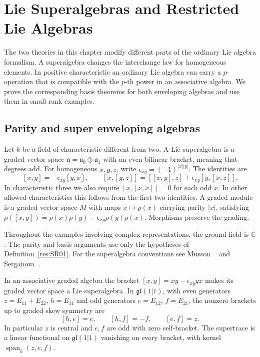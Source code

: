 \chapter{Lie Superalgebras and Restricted Lie Algebras}

The two theories in this chapter modify different parts of the ordinary
Lie algebra formalism. A superalgebra changes the interchange law for
homogeneous elements. In positive characteristic an ordinary Lie
algebra can carry a \(p\)-operation that is compatible with the
\(p\)-th power in an associative algebra. We prove the corresponding
basis theorems for both enveloping algebras and use them in small
rank examples.

\section{Parity and super enveloping algebras}

\begin{definition}
\label{res:SR01}
Let \(k\) be a field of characteristic different from two.
A Lie superalgebra is a graded vector space
\(\mathfrak a=\mathfrak a_{\overline 0}\oplus\mathfrak a_{\overline 1}\)
with an even bilinear bracket, meaning that degrees add. For
homogeneous \(x,y,z\), write
\(\epsilon_{xy}=(-1)^{|x||y|}\).
The identities are
\[
 [x,y]=-\epsilon_{xy}[y,x],
 \qquad [x,[y,z]]=[[x,y],z]+\epsilon_{xy}[y,[x,z]].
\]
In characteristic three we also require
\([x,[x,x]]=0\) for each odd \(x\). In other allowed characteristics
this follows from the first two identities. A graded module is a
graded vector space \(M\) with maps \(x\mapsto \rho(x)\) carrying
parity \(|x|\), satisfying
\(\rho([x,y])=\rho(x)\rho(y)-\epsilon_{xy}\rho(y)\rho(x)\).
Morphisms preserve the grading.
\end{definition}

Throughout the examples involving complex representations, the
ground field is \(\mathbb C\). The parity and basis arguments
use only the hypotheses of Definition~\ref{res:SR01}.
For the superalgebra conventions see Musson
~\cite[Section 1.1, PDF pp.~22--24]{musson}
and Serganova~\cite[Section 2]{serganova}.

\begin{proposition}
\label{res:SR02}
In an associative graded algebra the bracket
\([x,y]=xy-\epsilon_{xy}yx\) makes its graded vector space a
Lie superalgebra. In \(\mathfrak{gl}(1|1)\), with even
generators \(z=E_{11}+E_{22}\), \(h=E_{11}\) and odd
generators \(e=E_{12}\), \(f=E_{21}\), the nonzero brackets
up to graded skew symmetry are
\[
 [h,e]=e,\qquad [h,f]=-f,\qquad [e,f]=z .
\]
In particular \(z\) is central and \(e,f\) are odd with
zero self-bracket. The supertrace is a linear functional
on \(\mathfrak{gl}(1|1)\) vanishing on every bracket, with
kernel \(\operatorname{span}_k(z,e,f)\).
\end{proposition}

